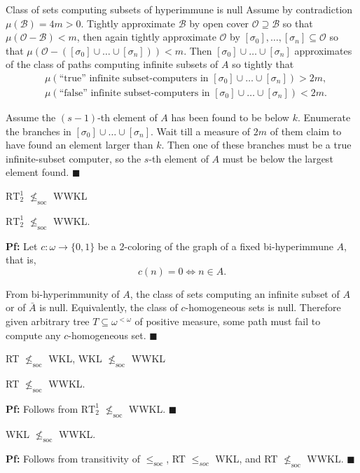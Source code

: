 \begin{frame}{Class of sets computing subsets of hyperimmune is null}
  Assume by contradiction $\mu(\mathcal{B})=4m>0$. Tightly approximate
  $\mathcal{B}$ by open cover $\mathcal{O}\supseteq\mathcal{B}$ so that
  $\mu(\mathcal{O}-\mathcal{B})<m$, then again tightly approximate
  $\mathcal{O}$ by $[\sigma_0],\ldots,[\sigma_n] \subseteq\mathcal{O}$ so
  that $\mu(\mathcal{O}-([\sigma_0]\cup\ldots\cup[\sigma_n])) <m$.
  Then $[\sigma_0]\cup\ldots\cup[\sigma_n]$ approximates of the class
  of paths computing infinite subsets of $A$ so tightly that
  \begin{align*}
    &\mu(\text{``true'' infinite subset-computers in }
    [\sigma_0]\cup\ldots\cup[\sigma_n])>2m,\\
    &\mu(\text{``false'' infinite subset-computers in }
    [\sigma_0]\cup\ldots\cup[\sigma_n])<2m.
  \end{align*}

  Assume the $(s-1)$-th element of $A$ has been found to be below $k$.
  Enumerate the branches in $[\sigma_0]\cup\ldots\cup[\sigma_n]$.  Wait
  till a measure of $2m$ of them claim to have found an element larger than
  $k$. Then one of these branches must be a true infinite-subset computer,
  so the $s$-th element of $A$ must be below the largest element found.
  $\blacksquare$
\end{frame}

\begin{frame}{$\text{RT}_2^1$ $\nleq_{\text{soc}}$ WWKL}
  \begin{thm}
    $\text{RT}_2^1$ $\nleq_{\text{soc}}$ WWKL.
  \end{thm}

  \vspace{1em}
  \textbf{Pf:} Let $c:\omega\rightarrow\{0,1\}$ be a 2-coloring of the
  graph of a fixed bi-hyperimmune $A$, that is,
  \[c(n)=0 \Leftrightarrow n\in A.\]
  
  From bi-hyperimmunity of $A$, the class of sets computing an infinite
  subset of $A$ or of $\bar{A}$ is null. Equivalently, the class of
  $c$-homogeneous sets is null. Therefore given arbitrary tree
  $T\subseteq\omega^{<\omega}$ of positive measure, some path must fail to
  compute any $c$-homogeneous set. $\blacksquare$
\end{frame}

\begin{frame}{RT $\nleq_{\text{soc}}$ WKL, WKL $\nleq_{\text{soc}}$ WWKL}
  \begin{coro}
    \label{coro:rt-wwkl}
    RT $\nleq_{\text{soc}}$ WWKL.
  \end{coro}
  \textbf{Pf:} Follows from $\text{RT}_2^1$ $\nleq_{\text{soc}}$ WWKL.
  $\blacksquare$

  \vspace{2em}
  \begin{coro}
    WKL $\nleq_{\text{soc}}$ WWKL.
  \end{coro}
  \textbf{Pf:} Follows from transitivity of $\leq_\text{soc}$,
  RT $\leq_{soc}$ WKL, and RT $\nleq_{\text{soc}}$ WWKL. $\blacksquare$
\end{frame}
